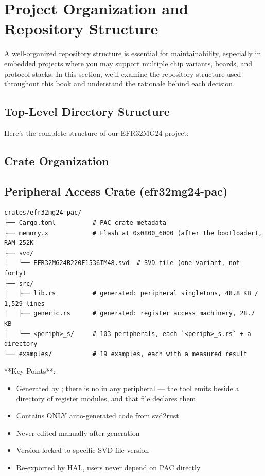 \section{Project Organization and Repository Structure}
\label{sec:project-organization}


A well-organized repository structure is essential for maintainability, especially in embedded projects where you may support multiple chip variants, boards, and protocol stacks. In this section, we'll examine the repository structure used throughout this book and understand the rationale behind each decision.

\subsection{Top-Level Directory Structure}

Here's the complete structure of our EFR32MG24 project:



\subsection{Crate Organization}

\subsection{Peripheral Access Crate (efr32mg24-pac)}

\begin{verbatim}
crates/efr32mg24-pac/
├── Cargo.toml          # PAC crate metadata
├── memory.x            # Flash at 0x0800_6000 (after the bootloader), RAM 252K
├── svd/
│   └── EFR32MG24B220F1536IM48.svd  # SVD file (one variant, not forty)
├── src/
│   ├── lib.rs          # generated: peripheral singletons, 48.8 KB / 1,529 lines
│   ├── generic.rs      # generated: register access machinery, 28.7 KB
│   └── <periph>_s/     # 103 peripherals, each `<periph>_s.rs` + a directory
└── examples/           # 19 examples, each with a measured result
\end{verbatim}

**Key Points**:
\begin{itemize}
    \item Generated by ; there is no  in
          any peripheral — the tool emits  beside a directory of
          register modules, and that file declares them
    \item Contains ONLY auto-generated code from svd2rust
    \item Never edited manually after generation
    \item Version locked to specific SVD file version
    \item Re-exported by HAL, users never depend on PAC directly
\end{itemize}

